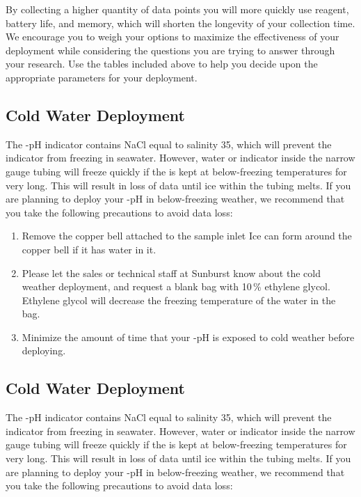 \fi

By collecting a higher quantity of data points you will more quickly use reagent, battery life, and memory, which will shorten the longevity of your collection time. We encourage you to weigh your options to maximize the effectiveness of your deployment while considering the questions you are trying to answer through your research. Use the tables included above to help you decide upon the appropriate parameters for your deployment.


\ifcase \inst	%

\subsection{Cold Water Deployment}

The \instType{}-pH indicator contains NaCl equal to salinity 35, which will prevent the indicator from freezing in seawater.  However, water or indicator inside the narrow gauge tubing will freeze quickly if the \instType{} is kept at below-freezing temperatures for very long.  This will result in loss of data until ice within the tubing melts.  If you are planning to deploy your \instType{}-pH in below-freezing weather, we recommend that you take the following precautions to avoid data loss:

\begin{enumerate}
\item
Remove the copper bell attached to the sample inlet \ifcase {}  \fi Ice can form around the copper bell if it has water in it.
\item
Please let the sales or technical staff at Sunburst know about the cold weather deployment, and request a blank bag with 10\,\% ethylene glycol. Ethylene glycol will decrease the freezing temperature of the water in the bag.
\item
Minimize the amount of time that your \instType{}-pH is exposed to cold weather before deploying.
\end{enumerate}

\or			%

\subsection{Cold Water Deployment}

The \instType{}-pH indicator contains NaCl equal to salinity 35, which will prevent the indicator from freezing in seawater.  However, water or indicator inside the narrow gauge tubing will freeze quickly if the \instType{} is kept at below-freezing temperatures for very long.  This will result in loss of data until ice within the tubing melts.  If you are planning to deploy your \instType{}-pH in below-freezing weather, we recommend that you take the following precautions to avoid data loss:

